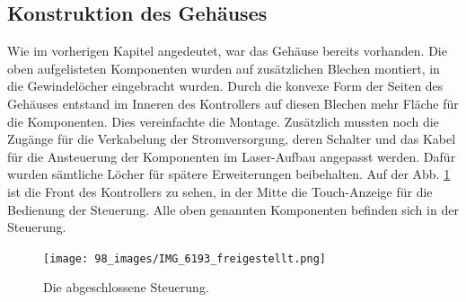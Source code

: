 \clearpage
\subsection{Konstruktion des Gehäuses}
Wie im vorherigen Kapitel angedeutet, war das Gehäuse bereits vorhanden. Die oben aufgelisteten Komponenten wurden auf zusätzlichen Blechen montiert, in die Gewindelöcher eingebracht wurden. Durch die konvexe Form der Seiten des Gehäuses entstand im Inneren des Kontrollers auf diesen Blechen mehr Fläche für die Komponenten. Dies vereinfachte die Montage. Zusätzlich mussten noch die Zugänge für die Verkabelung der Stromversorgung, deren Schalter und das Kabel für die Ansteuerung der Komponenten im Laser-Aufbau angepasst werden. Dafür wurden sämtliche Löcher für spätere Erweiterungen beibehalten. Auf der Abb. \ref{fig:controller_free} ist die Front des Kontrollers zu sehen, in der Mitte die Touch-Anzeige für die Bedienung der Steuerung. Alle oben genannten Komponenten befinden sich in der Steuerung.

\begin{figure}[H]
    \centering
    \texttt{[image: 98\_images/IMG\_6193\_freigestellt.png]}
    \caption{Die abgeschlossene Steuerung.}
    \label{fig:controller_free}
\end{figure}
